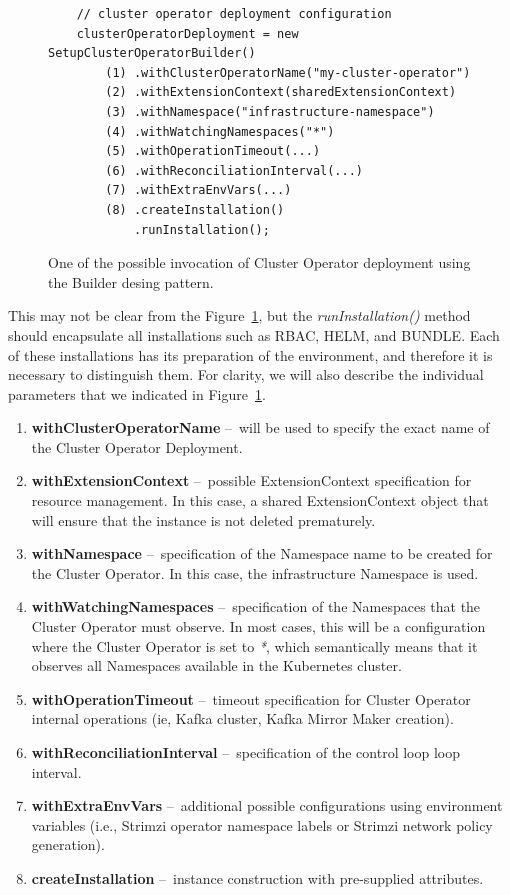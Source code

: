 \begin{figure}[ht!]
    \centering
    \begin{verbatim}
    // cluster operator deployment configuration
    clusterOperatorDeployment = new SetupClusterOperatorBuilder()
        (1) .withClusterOperatorName("my-cluster-operator")
        (2) .withExtensionContext(sharedExtensionContext)
        (3) .withNamespace("infrastructure-namespace")
        (4) .withWatchingNamespaces("*")
        (5) .withOperationTimeout(...)
        (6) .withReconciliationInterval(...)
        (7) .withExtraEnvVars(...)
        (8) .createInstallation()
            .runInstallation();
    \end{verbatim}
    \caption{One of the possible invocation of Cluster Operator deployment using the Builder desing pattern.}
    \label{05:fig:clusteroperatorinstallation}
\end{figure}

This may not be clear from the Figure~\ref{05:fig:clusteroperatorinstallation}, but the \emph{runInstallation()} method should encapsulate all installations such as RBAC, HELM, and BUNDLE. Each of these installations has its preparation of the environment, and therefore it is necessary to distinguish them. For clarity, we will also describe the individual parameters that we indicated in Figure~\ref{05:fig:clusteroperatorinstallation}.

\begin{enumerate}[itemsep = 1mm, parsep = 0pt]
    \item \textbf{withClusterOperatorName} \---\ will be used to specify the exact name of the Cluster Operator Deployment.
    \item \textbf{withExtensionContext} \---\ possible ExtensionContext specification for resource management.
    In this case, a shared ExtensionContext object that will ensure that the instance is not deleted prematurely.
    \item \textbf{withNamespace} \---\ specification of the Namespace name to be created for the Cluster Operator.
    In this case, the infrastructure Namespace is used.
    \item \textbf{withWatchingNamespaces} \---\ specification of the Namespaces that the Cluster Operator must observe.
    In most cases, this will be a configuration where the Cluster Operator is set to \emph{*}, which semantically means that it observes all Namespaces available in the Kubernetes cluster.
    \item \textbf{withOperationTimeout} \---\ timeout specification for Cluster Operator internal operations (ie, Kafka cluster, Kafka Mirror Maker creation).
    \item \textbf{withReconciliationInterval} \---\ specification of the control loop loop interval.
    \item \textbf{withExtraEnvVars} \---\ additional possible configurations using environment variables (i.e., Strimzi operator namespace labels or Strimzi network policy generation).
    \item \textbf{createInstallation} \---\ instance construction with pre-supplied attributes.
\end{enumerate}

